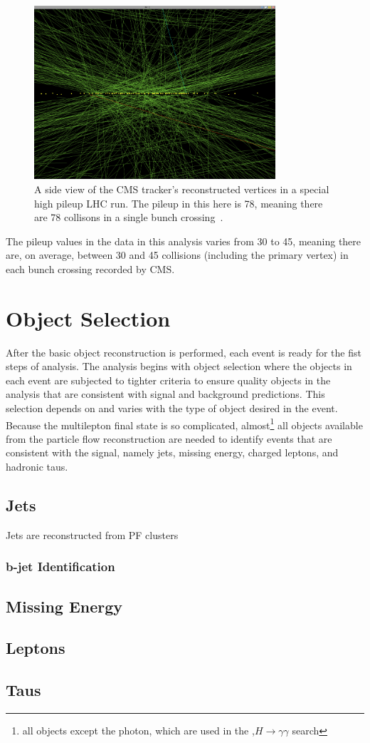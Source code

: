 \begin{figure}[hbtp]
 \begin{center}
   \includegraphics[width=0.8\textwidth]{ch4_figs/cms_pileup.pdf}
   \caption{A side view of the CMS tracker's reconstructed vertices in a special high pileup LHC run. The pileup in this here is 78, meaning there are
78 collisons in a single bunch crossing~\cite{pileup_image}.}
   \label{fig:pileup_vertices}
 \end{center}
\end{figure}

\noindent The pileup values in the data in this analysis varies from 30 to 45, meaning there are, on average, between 30 and 45 collisions (including the primary vertex) in each
bunch crossing recorded by CMS. 


\section{Object Selection}
After the basic object reconstruction is performed, each event is ready for the fist steps of analysis. The analysis begins with object selection where the objects in each
event are subjected to tighter criteria to ensure quality objects in the analysis that are consistent with signal and background predictions. This selection depends on and 
varies with the type of object desired in the event. Because the \tth multilepton final state is so complicated, almost\footnote{all objects except the photon, which are
used in the \tth,$H\rightarrow\gamma\gamma$ search} all objects available from the particle flow
reconstruction are needed to identify events that are consistent with the signal, namely jets, missing energy, charged leptons, and hadronic taus.

\subsection{Jets}
Jets are reconstructed from PF clusters 
\subsubsection{b-jet Identification}
\subsection{Missing Energy}
\subsection{Leptons}
\subsection{Taus}

